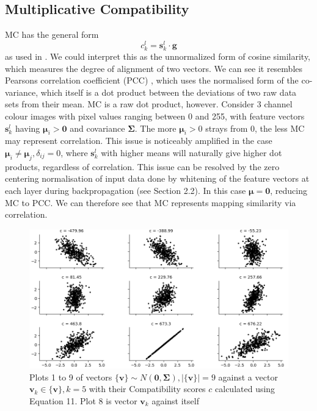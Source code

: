 \documentclass[11pt]{article}
\begin{document}
\subsection{Multiplicative Compatibility}

MC has the general form
\begin{equation}
c^{l}_{k} = \bm{s}^{l}_{k} \cdot \bm{g}
\end{equation}
as used in \cite{jetley}. We could interpret this as the unnormalized form of cosine similarity, which measures the degree of alignment of two vectors. We can see it resembles Pearsons correlation coefficient (PCC) \cite{pearson}, which uses the normalised form of the co-variance, which itself is a dot product between the deviations of two raw data sets from their mean. MC is a raw dot product, however. Consider 3 channel colour images with pixel values ranging between 0 and 255, with feature vectors $\bm{s}^{l}_{k}$ having $\bm{\mu}_i > \bm{0}$ and covariance $\bm{\Sigma}$. The more $\bm{\mu}_i > 0$ strays from 0, the less MC may represent correlation. This issue is noticeably amplified in the case $\bm{\mu}_i \neq \bm{\mu}_j, \delta_{ij} = 0$, where $\bm{s}^{l}_{k}$ with higher means will naturally give higher dot products, regardless of correlation. This issue can be resolved by the zero centering normalisation of input data done by whitening of the feature vectors at each layer during backpropagation (see Section 2.2). In this case $\bm{\mu} = \bm{0}$, reducing MC to PCC. We can therefore see that MC represents mapping similarity via correlation. \newline

\begin{figure}[htp]
    \centering
    \includegraphics[width=15cm]{figures/cnnfig3.png}
    \caption{Plots 1 to 9 of vectors $\{\bm{v}\} \sim N(\bm{0}, \bm{\Sigma}), |\{\bm{v}\}| = 9$ against a vector $\bm{v}_k \in \{\bm{v}\}, k=5$ with their Compatibility scores $c$ calculated using Equation 11. Plot 8 is vector $\bm{v}_k$ against itself}
 \end{figure}
 
\end{document}
